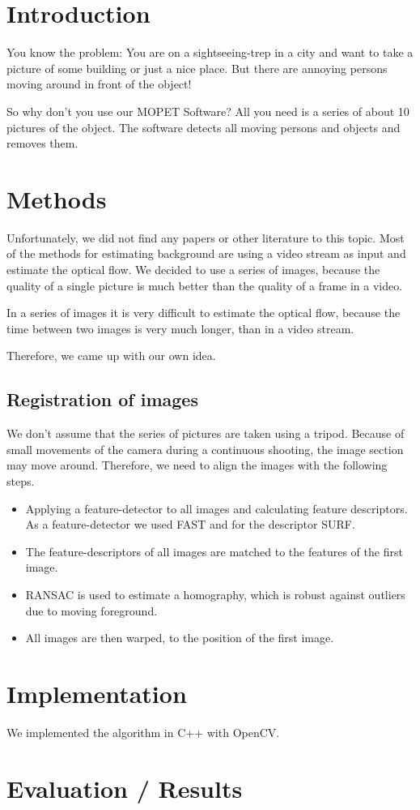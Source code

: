 \chapter{Introduction}

You know the problem: You are on a sightseeing-trep in a city and want to take a picture of some
building or just a nice place. But there are annoying persons moving around in front
of the object!

So why don't you use our MOPET Software?
All you need is a series of about 10 pictures of the object. The software 
detects all moving persons and objects and removes them.



\chapter{Methods}

Unfortunately, we did not find any papers or other literature to this topic. Most of the methods for estimating
background are using a video stream as input and estimate the optical flow.
We decided to use a series of images,
because the quality of a single picture is much better than the quality of a frame in a video.

In a series of images it is very difficult to estimate the optical flow, because the time between
two images is very much longer, than in a video stream.

Therefore, we came up with our own idea.

\section{Registration of images}

We don't assume that the series of pictures are taken using a tripod.
Because of small movements of the camera during a continuous shooting, the image section may move
around.
Therefore, we need to align the images with the following steps.

\begin{itemize}
 \item Applying a feature-detector to all images and calculating feature descriptors.
  As a feature-detector we used FAST and for the descriptor SURF.
 \item The feature-descriptors of all images are matched to the features of the first image.
 \item RANSAC is used to estimate a homography, which is robust against outliers due to moving foreground.
 \item All images are then warped, to the position of the first image.
\end{itemize}



\chapter{Implementation}

We implemented the algorithm in C++ with OpenCV.

\chapter{Evaluation / Results}







